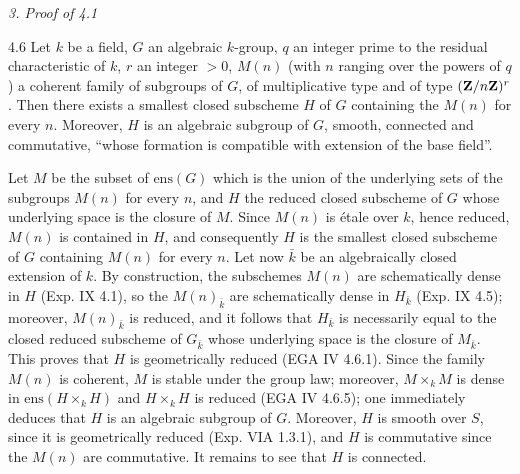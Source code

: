 \par\medskip\noindent\textit{3. Proof of 4.1}\par
\begin{lemma}{4.6}\label{XV.4.6}
Let $k$ be a field, $G$ an algebraic $k$-group, $q$ an integer prime to the residual characteristic of $k$, $r$ an integer $>0$, $M(n)$ (with $n$ ranging over the powers of $q$) a coherent family of subgroups of $G$, of multiplicative type and of type $(\mathbf{Z}/n\mathbf{Z})^r$. Then there exists a smallest closed subscheme $H$ of $G$ containing the $M(n)$ for every $n$. Moreover, $H$ is an algebraic subgroup of $G$, smooth, connected and commutative, ``whose formation is compatible with extension of the base field''.
\end{lemma}
Let $M$ be the subset of $\mathrm{ens}(G)$ which is the union of the underlying sets of the subgroups $M(n)$ for every $n$, and $H$ the reduced closed subscheme of $G$ whose underlying space is the closure of $M$. Since $M(n)$ is \'etale over $k$, hence reduced, $M(n)$ is contained in $H$, and consequently $H$ is the smallest closed subscheme of $G$ containing $M(n)$ for every $n$. Let now $\bar k$ be an algebraically closed extension of $k$. By construction, the subschemes $M(n)$ are schematically dense in $H$ (Exp. IX 4.1), so the $M(n)_{\bar k}$ are schematically dense in $H_{\bar k}$ (Exp. IX 4.5); moreover, $M(n)_{\bar k}$ is reduced, and it follows that $H_{\bar k}$ is necessarily equal to the closed reduced subscheme of $G_{\bar k}$ whose underlying space is the closure of $M_{\bar k}$. This proves that $H$ is geometrically reduced (EGA IV 4.6.1). Since the family $M(n)$ is coherent, $M$ is stable under the group law; moreover, $M\times_k M$ is dense in $\mathrm{ens}(H\times_k H)$ and $H\times_k H$ is reduced (EGA IV 4.6.5); one immediately deduces that $H$ is an algebraic subgroup of $G$. Moreover, $H$ is smooth over $S$, since it is geometrically reduced (Exp. VIA 1.3.1), and $H$ is commutative since the $M(n)$ are commutative. It remains to see that $H$ is connected.
